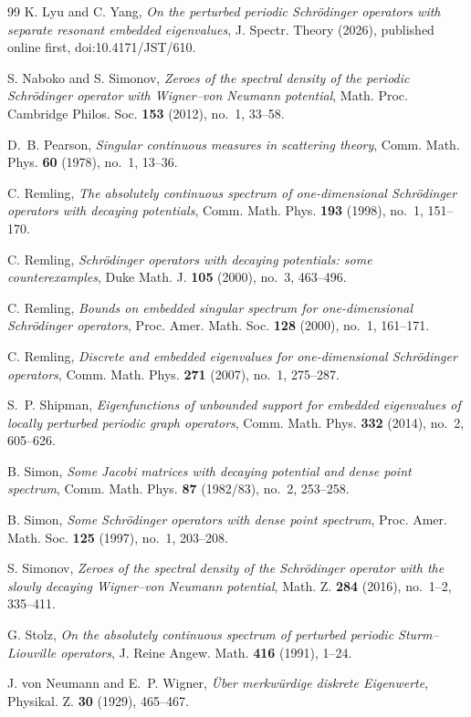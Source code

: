 \documentclass[12pt]{amsart}
\theoremstyle{plain}
\theoremstyle{definition}
\begin{document}
\begin{thebibliography}{99}
	K. Lyu and C. Yang,
	\emph{On the perturbed periodic Schr\"odinger operators with separate
		resonant embedded eigenvalues},
	J. Spectr. Theory (2026), published online first,
	doi:10.4171/JST/610.
	
	
	
	S. Naboko and S. Simonov,
	\emph{Zeroes of the spectral density of the periodic Schr\"odinger
		operator with Wigner--von Neumann potential},
	Math. Proc. Cambridge Philos. Soc. \textbf{153} (2012), no.~1, 33--58.
	
	D.~B. Pearson,
	\emph{Singular continuous measures in scattering theory},
	Comm. Math. Phys. \textbf{60} (1978), no.~1, 13--36.
	
	C. Remling,
	\emph{The absolutely continuous spectrum of one-dimensional
		Schr\"odinger operators with decaying potentials},
	Comm. Math. Phys. \textbf{193} (1998), no.~1, 151--170.
	
	C. Remling,
	\emph{Schr\"odinger operators with decaying potentials: some
		counterexamples},
	Duke Math. J. \textbf{105} (2000), no.~3, 463--496.
	
	C. Remling,
	\emph{Bounds on embedded singular spectrum for one-dimensional
		Schr\"odinger operators},
	Proc. Amer. Math. Soc. \textbf{128} (2000), no.~1, 161--171.
	
	C. Remling,
	\emph{Discrete and embedded eigenvalues for one-dimensional
		Schr\"odinger operators},
	Comm. Math. Phys. \textbf{271} (2007), no.~1, 275--287.
	
	
	S.~P. Shipman,
	\emph{Eigenfunctions of unbounded support for embedded eigenvalues of
		locally perturbed periodic graph operators},
	Comm. Math. Phys. \textbf{332} (2014), no.~2, 605--626.
	
	B. Simon,
	\emph{Some Jacobi matrices with decaying potential and dense point
		spectrum},
	Comm. Math. Phys. \textbf{87} (1982/83), no.~2, 253--258.
	
	B. Simon,
	\emph{Some Schr\"odinger operators with dense point spectrum},
	Proc. Amer. Math. Soc. \textbf{125} (1997), no.~1, 203--208.
	
	S. Simonov,
	\emph{Zeroes of the spectral density of the Schr\"odinger operator
		with the slowly decaying Wigner--von Neumann potential},
	Math. Z. \textbf{284} (2016), no.~1--2, 335--411.
	
	G. Stolz,
	\emph{On the absolutely continuous spectrum of perturbed periodic
		Sturm--Liouville operators},
	J. Reine Angew. Math. \textbf{416} (1991), 1--24.
	
	J. von Neumann and E.~P. Wigner,
	\emph{\"Uber merkw\"urdige diskrete Eigenwerte},
	Physikal. Z. \textbf{30} (1929), 465--467.
	
\end{thebibliography}
\end{document}
